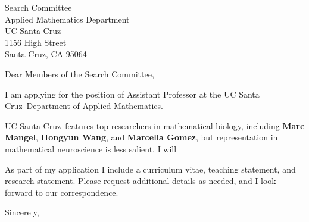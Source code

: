 \documentclass[11pt,a4paper]{letter}
\begin{document}

\def\School{UC Santa Cruz}

\begin{letter}
{Search Committee\\
Applied Mathematics Department\\
UC Santa Cruz\\
1156 High Street\\
Santa Cruz, CA 95064}


\opening{Dear Members of the Search Committee,}

I am applying for the position of Assistant Professor at the \School~Department of Applied Mathematics. 



\School~features top researchers in mathematical biology, including \textbf{Marc Mangel}, \textbf{Hongyun Wang}, and \textbf{Marcella Gomez}, but representation in mathematical neuroscience is less salient. I will 



As part of my application I include a curriculum vitae, teaching statement, and research statement. Please request additional details as needed, and I look forward to our correspondence.

\closing{Sincerely,}
\end{letter}
\end{document}
